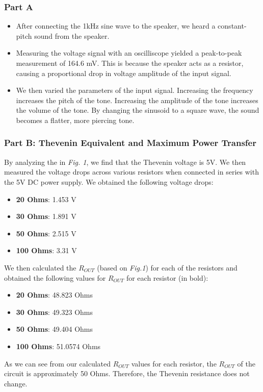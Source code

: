 \documentclass[10pt]{article}
\begin{document}
\subsubsection{Part A}
\begin{itemize}
	\item After connecting the 1kHz sine wave to the speaker, we heard a constant-pitch sound from the speaker.
	\item Measuring the voltage signal with an oscilliscope yielded a peak-to-peak measurement of 164.6 mV. This is because the speaker acts as a resistor, causing a proportional drop in voltage amplitude of the input signal. 
	\item We then varied the parameters of the input signal. Increasing the frequency increases the pitch of the tone. Increasing the amplitude of the tone increases the volume of the tone. By changing the sinusoid to a square wave, the sound becomes a flatter, more piercing tone. 
\end{itemize}

\subsubsection{Part B: Thevenin Equivalent and Maximum Power Transfer}
By analyzing the in \textit{Fig. 1}, we find that the Thevenin voltage is 5V. We then measured the voltage drops across various resistors when connected in series with the 5V DC power supply. We obtained the following voltage drops:
\begin{itemize}
	\item \textbf{20 Ohms}: 1.453 V
	\item \textbf{30 Ohms}: 1.891 V
	\item \textbf{50 Ohms}: 2.515 V
	\item \textbf{100 Ohms}: 3.31 V
\end{itemize} 

We then calculated the $R_{OUT}$ (based on \textit{Fig.1}) for each of the resistors and obtained the following values for $R_{OUT}$ for each resistor (in bold):
\begin{itemize}
	\item \textbf{20 Ohms}: 48.823 Ohms
	\item \textbf{30 Ohms}: 49.323 Ohms
	\item \textbf{50 Ohms}: 49.404 Ohms
	\item \textbf{100 Ohms}: 51.0574 Ohms
\end{itemize} 

As we can see from our calculated $R_{OUT}$ values for each resistor, the $R_{OUT}$ of the circuit is approximately 50 Ohms. Therefore, the Thevenin resistance does not change. 
\end{document}
